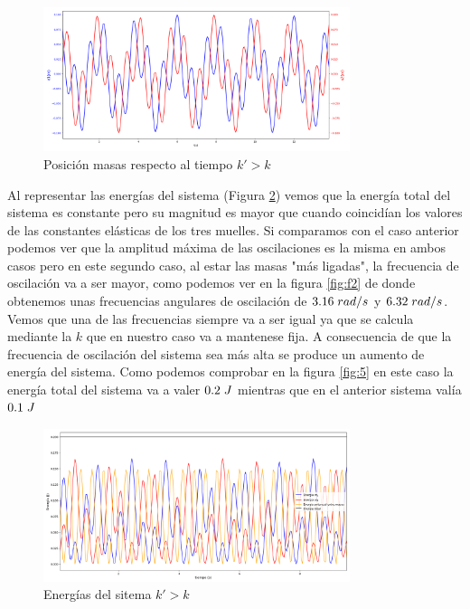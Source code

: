 \documentclass{article}
\begin{document}
\begin{figure}[H]
    \centering
    \includegraphics[width=0.8\textwidth]{posicion_k_mayor}
\caption{Posición masas respecto al tiempo $k'>k$}
\label{fig:3}
\end{figure}
Al representar las energías del sistema (Figura \ref{fig:4}) vemos que la energía total del sistema es constante pero su magnitud es mayor que cuando coincidían los valores de las constantes elásticas de los tres muelles.\newline\linebreak
Si comparamos con el caso anterior podemos ver que la amplitud máxima de las oscilaciones es la misma en ambos casos pero en este segundo caso, al estar las masas "más ligadas", la frecuencia de oscilación va a ser mayor, como podemos ver en la figura \ref{fig:f2} de donde obtenemos unas frecuencias angulares de oscilación de $3.16 \hspace{0.1cm}rad/s$ y $6.32 \hspace{0.1cm}rad/s$. Vemos que una de las frecuencias siempre va a ser igual ya que se calcula mediante la $k$ que en nuestro caso va a mantenese fija.\newline\linebreak
A consecuencia de que la frecuencia de oscilación del sistema sea más alta se produce un aumento de energía  del sistema. Como podemos comprobar en la figura \ref{fig:5} en este caso la energía total del sistema va a valer $0.2\hspace{0.1cm}J$ mientras que en el anterior sistema valía $0.1\hspace{0.1cm}J$
\begin{figure}[H]
    \centering
    \includegraphics[width=0.8\textwidth]{energias_k_mayor}
\caption{Energías del sitema $k'>k$}
\label{fig:4}
\end{figure}
\end{document}
